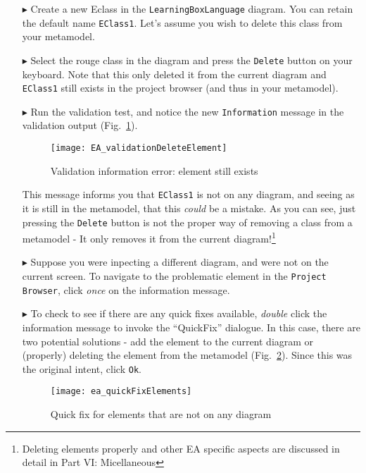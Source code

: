 \begin{enumerate}
\item[$\blacktriangleright$] Create a new Eclass in the \texttt{Learning\-Box\-Language} diagram. You can retain the default name \texttt{EClass1}. Let's
assume you wish to delete this class from your metamodel.

\item[$\blacktriangleright$] Select the rouge class in the diagram and press the \texttt{Delete} button on your keyboard. Note that this only deleted it from
the current diagram and \texttt{EClass1} still exists in the project browser (and thus in your metamodel).

\item[$\blacktriangleright$] Run the validation test, and notice the new \texttt{Information} message in the validation output
(Fig.~\ref{fig:validation_information}).

\begin{figure}[htbp]
	\centering
  \texttt{[image: EA\_validationDeleteElement]}
	\caption{Validation information error: element still exists}
	\label{fig:validation_information}
\end{figure}

This message informs you that \texttt{EClass1} is not on any diagram, and seeing as it is still in the metamodel, that this \emph{could} be a mistake. As you
can see, just pressing the \texttt{Delete} button is not the proper way of removing a class from a metamodel - It only removes it from the current
diagram!\footnote{Deleting elements properly and other EA specific aspects are discussed in detail in Part VI: Micellaneous}

\item[$\blacktriangleright$] Suppose you were inpecting a different diagram, and were not on the current screen. To navigate to the problematic element in the
\texttt{Project Browser}, click \emph{once} on the information message.

\item[$\blacktriangleright$] To check to see if there are any quick fixes available, \emph{double} click the information message to invoke the ``QuickFix''
dialogue. In this case, there are two potential solutions - add the element to the current diagram or (properly) deleting the element from the metamodel
(Fig.~\ref{fig:quick-fix1}). Since this was the original intent, click \texttt{Ok}.

\begin{figure}[htbp]
	\centering
  \texttt{[image: ea\_quickFixElements]}
	\caption{Quick fix for elements that are not on any diagram}
	\label{fig:quick-fix1}
\end{figure}
\FloatBarrier


\end{enumerate}
